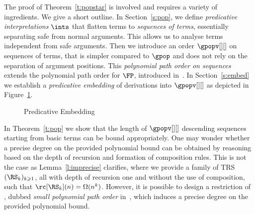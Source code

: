 \documentclass{LMCS}
\begin{document}
\label{popstar:proofplan}
The proof of Theorem~\ref{t:popstar} is involved and requires
a variety of ingredients. We give a short outline.
In Section~\ref{s:pop}, we define \emph{predicative interpretations} $\ints$
that flatten terms to \emph{sequences of terms}, essentially separating 
safe from normal arguments. This allows us to analyse terms independent from safe arguments.
Then we introduce an order $\gpopv[][]$ on sequences of terms, 
that is simpler compared to $\gpop$ and does not rely on the separation
of argument positions.  This \emph{polynomial path order on
sequences} extends the polynomial path order for $\FP$, introduced in~\cite{AM05}.
In Section~\ref{s:embed} we establish a \emph{predicative embedding}
of derivations into $\gpopv[][]$ as depicted in Figure~\ref{fig:2}.

\begin{figure}
\begin{center}
\end{center}
\caption{Predicative Embedding}
\label{fig:2}
\end{figure}

In Theorem~\ref{t:pop} we show that the length of $\gpopv[][]$ descending sequences
starting from basic terms can be bound appropriately.
One may wonder whether a precise degree on the provided polynomial bound can be obtained
by reasoning based on the depth of recursion and formation of composition rules.
This is not the case as Lemma~\ref{l:imprecise} clarifies, where 
we provide a family of TRS $(\RS_k)_{k \geqslant 1}$, 
all with depth of recursion one and without the use of composition, such that ${\rc[\RS_k](n)} = \Omega(n^k)$.
However, it is possible to design a restriction of \POPSTAR, dubbed
\emph{small polynomial path order} in~\cite{AEM12}, which induces 
a precise degree on the provided polynomial bound.
\end{document}

